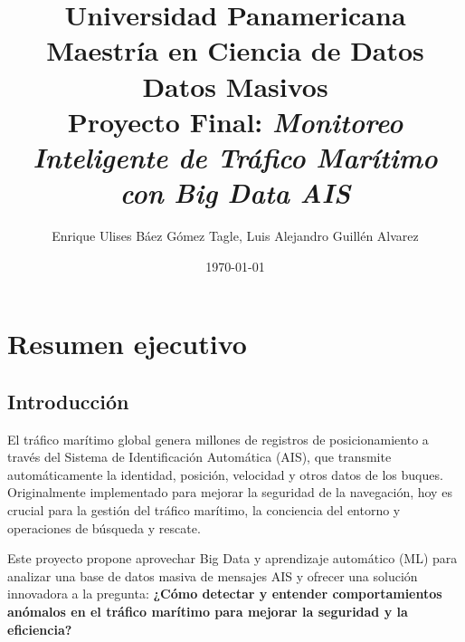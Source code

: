 \documentclass[10pt]{article}
\title{Universidad Panamericana \\ Maestría en Ciencia de Datos \\ Datos Masivos \\ 
    \vspace{0.5cm} Proyecto Final: \textit{Monitoreo Inteligente de Tráfico Marítimo con Big Data AIS}}
\author{Enrique Ulises Báez Gómez Tagle, Luis Alejandro Guillén Alvarez}
\date{\today}
\begin{document}
\maketitle

\tableofcontents

\newpage

\section{Resumen ejecutivo}
\subsection{Introducción} %

El tráfico marítimo global genera millones de registros de posicionamiento a través del Sistema de Identificación Automática (AIS), que transmite automáticamente la identidad, posición, velocidad y otros datos de los buques. Originalmente implementado para mejorar la seguridad de la navegación, hoy es crucial para la gestión del tráfico marítimo, la conciencia del entorno y operaciones de búsqueda y rescate.

Este proyecto propone aprovechar Big Data y aprendizaje automático (ML) para analizar una base de datos masiva de mensajes AIS y ofrecer una solución innovadora a la pregunta: \textbf{¿Cómo detectar y entender comportamientos anómalos en el tráfico marítimo para mejorar la seguridad y la eficiencia?}
\end{document}

